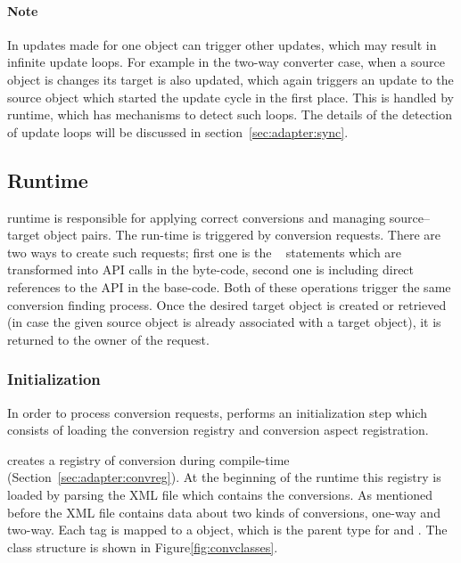 \paragraph{Note} In \zamk updates made for one object can trigger other updates, which may result in infinite update loops. 
For example in the two-way converter case, when a source object is changes its target is also updated, which again triggers an update to the source object which started the update cycle in the first place. 
This is handled by \zamk runtime, which has mechanisms to detect such loops. The details of the detection of update loops will be discussed in section~\ref{sec:adapter:sync}.



\subsection{Runtime}
\label{sec:adapter:runtime}
\zamk runtime is responsible for applying correct conversions and managing source--target object pairs. 
The \zamk run-time is triggered by conversion requests. 
There are two ways to create such requests; first one is the \gluer~ statements which are transformed into \zamk API calls in the byte-code, second one is including direct references to the \zamk API in the base-code. 
Both of these operations trigger the same conversion finding process. 
Once the desired target object is created or retrieved (in case the given source object is already associated with a target object), it is returned to the owner of the request. 


\subsubsection{Initialization}
\label{sec:adapter:loadconvreg}
In order to process conversion requests, \zamk performs an initialization step which consists of loading the conversion registry and conversion aspect registration. 

\zamk creates a registry of conversion during compile-time (Section~\ref{sec:adapter:convreg}). 
At the beginning of the runtime this registry is loaded by parsing the XML file which contains the conversions. 
As mentioned before the XML file contains data about two kinds of conversions, one-way and two-way.
Each  tag is mapped to a  object, which is the parent type for  and .
The class structure is shown in Figure\ref{fig:convclasses}.

